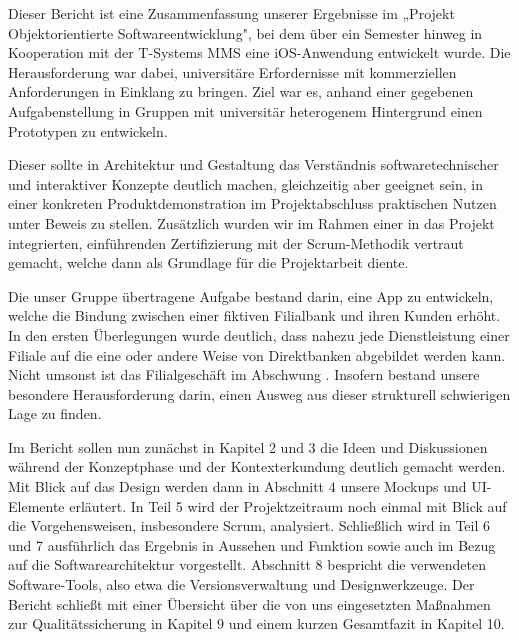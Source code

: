 	Dieser Bericht ist eine Zusammenfassung unserer Ergebnisse im „Projekt Objektorientierte Softwareentwicklung", bei dem über ein Semester hinweg in Kooperation mit der T-Systems MMS eine iOS-Anwendung entwickelt wurde. Die Herausforderung war dabei, universitäre Erfordernisse mit kommerziellen Anforderungen in Einklang zu bringen. Ziel war es, anhand einer gegebenen Aufgabenstellung in Gruppen mit universitär heterogenem Hintergrund einen Prototypen zu entwickeln.
	
	Dieser sollte in Architektur und Gestaltung das Verständnis softwaretechnischer und interaktiver Konzepte deutlich machen, gleichzeitig aber geeignet sein, in einer konkreten Produktdemonstration im Projektabschluss praktischen Nutzen unter Beweis zu stellen. Zusätzlich wurden wir im Rahmen einer in das Projekt integrierten, einführenden Zertifizierung mit der Scrum-Methodik vertraut gemacht, welche dann als Grundlage für die Projektarbeit diente. 

	Die unser Gruppe übertragene Aufgabe bestand darin, eine App zu entwickeln, welche die Bindung zwischen einer fiktiven Filialbank und ihren Kunden erhöht. In den ersten Überlegungen wurde deutlich, dass nahezu jede Dienstleistung einer Filiale auf die eine oder andere Weise von Direktbanken abgebildet werden kann. Nicht umsonst ist das Filialgeschäft im Abschwung \citep{Welt14}. Insofern bestand unsere besondere Herausforderung darin, einen Ausweg aus dieser strukturell schwierigen Lage zu finden.
	
	Im Bericht sollen nun zunächst in Kapitel 2 und 3 die Ideen und Diskussionen während der Konzeptphase und der Kontexterkundung deutlich gemacht werden. Mit Blick auf das Design werden dann in Abschnitt 4 unsere Mockups und UI-Elemente erläutert. In Teil 5 wird der Projektzeitraum noch einmal mit Blick auf die Vorgehensweisen, insbesondere Scrum, analysiert. Schließlich wird in Teil 6 und 7 ausführlich das Ergebnis in Aussehen und Funktion sowie auch im Bezug auf die Softwarearchitektur vorgestellt. Abschnitt 8 bespricht die verwendeten Software-Tools, also etwa die Versionsverwaltung und Designwerkzeuge. Der Bericht schließt mit einer Übersicht über die von uns eingesetzten Maßnahmen zur Qualitätssicherung in Kapitel 9 und einem kurzen Gesamtfazit in Kapitel 10.
	 